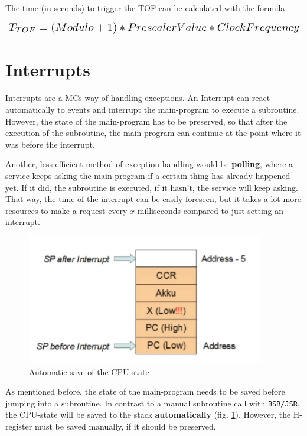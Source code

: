\documentclass[a4paper, 11pt, nofootinbib]{book}
\newcommand{\code}[1]{\texttt{#1}}
\begin{document}
\vspace{10px}

\noindent The time (in seconds) to trigger the TOF can be calculated with the formula

\[ \scalebox{1.5}{$T_{TOF} = (Modulo + 1) * PrescalerValue * ClockFrequency $} \]

\section{Interrupts}
Interrupts are a MCs way of handling exceptions. An Interrupt can react automatically to events and interrupt the main-program to execute a subroutine. However, the state of the main-program has to be preserved, so that after the execution of the subroutine, the main-program can continue at the point where it was before the interrupt. 

\vspace{10px}

\noindent Another, less efficient method of exception handling would be \textbf{polling}, where a service keeps asking the main-program if a certain thing has already happened yet. If it did, the subroutine is executed, if it hasn't, the service will keep asking. That way, the time of the interrupt can be easily foreseen, but it takes a lot more resources to make a request every $x$ milliseconds compared to just setting an interrupt.

\begin{figure}
	\centering
	\includegraphics[keepaspectratio=true,height=10\baselineskip]{save_interrupt.jpg}
	\caption{Automatic save of the CPU-state}
	\label{fig:saveInterrupt}
\end{figure}

\vspace{10px}

\noindent As mentioned before, the state of the main-program needs to be saved before jumping into a subroutine. In contrast to a manual subroutine call with \code{BSR/JSR}, the CPU-state will be saved to the stack \textbf{automatically} (fig. \ref{fig:saveInterrupt}). However, the H-register must be saved manually, if it should be preserved.
\end{document}
